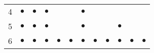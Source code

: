 \begin{table}[ht!]
\begin{tabular}{cccccccccccc}
4                                       & $\bullet$                                   & $\bullet$                                                                                    & $\bullet$                   &                                          &                                          & $\bullet$                  &                                          &                                          &                            &                                          &                     \\
5                                       & $\bullet$                                   & $\bullet$                                                                                    & $\bullet$                   &                                          &                                          & $\bullet$                  &                                          &                                          & $\bullet$                  &                                          &                     \\
6                                       & $\bullet$                                   & $\bullet$                                                                                    & $\bullet$                   & $\bullet$                                & $\bullet$                                & $\bullet$                  & $\bullet$                                & $\bullet$                                & $\bullet$                  & $\bullet$                                & $\bullet$           \\ \hline
\end{tabular}
\end{table}
